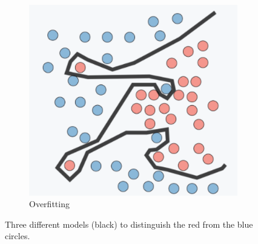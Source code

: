 \begin{figure}[H]
\begin{subfigure}{.33\textwidth}
  \includegraphics[width=.8\linewidth]{figs/overtraining.png}
  \caption{Overfitting}
  \label{fig:Overfitting}
\end{subfigure}
\caption{Three different models (black) to distinguish the red from the blue circles. \cite{OVPic}}
\label{fig:fitting}
\end{figure}


